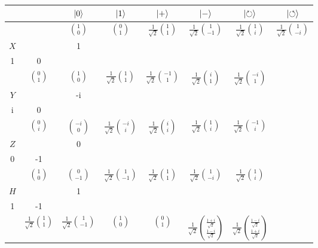 \begin{table}
\begin{tabular}{|c|c||c|c|c|c|c|c|}
\hline
 & & \(\Ket{0}\) & \(\Ket{1}\) & \(\Ket{+}\) & \(\Ket{-}\) & \(\Ket{\circlearrowright}\) & \(\Ket{\circlearrowleft}\) \\
\hline
 & & \(\binom{1}{0}\) & \(\binom{0}{1}\) & \(\frac{1}{\sqrt{2}} \binom{1}{1}\) & \(\frac{1}{\sqrt{2}} \binom{1}{-1}\) & \(\frac{1}{\sqrt{2}}\binom{1}{i}\) & \(\frac{1}{\sqrt{2}} \binom{1}{-i}\) \\
\hline

\(X\) &  \(\begin{pmatrix}
0 & 1\\
1 & 0\\
\end{pmatrix} \) & \(\binom{0}{1}\) & \(\binom{1}{0}\) & \(\frac{1}{\sqrt{2}} \binom{1}{1}\) & \(\frac{1}{\sqrt{2}} \binom{-1}{1}\) & \(\frac{1}{\sqrt{2}} \binom{i}{1}\) & \(\frac{1}{\sqrt{2}} \binom{-i}{1}\) \\
\hline

\(Y\)  &  \(\begin{pmatrix}
0 & -i\\
i & 0\\
\end{pmatrix} \) & \(\binom{0}{i}\) & \(\binom{-i}{0}\) & \(\frac{1}{\sqrt{2}} \binom{-i}{i}\) & \(\frac{1}{\sqrt{2}} \binom{i}{i}\) & \(\frac{1}{\sqrt{2}} \binom{1}{i}\) & \(\frac{1}{\sqrt{2}} \binom{-1}{i}\) \\
\hline

\(Z\)  &  \(\begin{pmatrix}
1 & 0\\
0 & -1\\
\end{pmatrix} \) & \(\binom{1}{0}\) & \(\binom{0}{-1}\) & \(\frac{1}{\sqrt{2}} \binom{1}{-1}\) & \(\frac{1}{\sqrt{2}} \binom{1}{1}\) & \(\frac{1}{\sqrt{2}} \binom{1}{-i}\) & \(\frac{1}{\sqrt{2}} \binom{1}{i}\) \\
\hline

\(H\)  &  \(\frac{1}{\sqrt{2}}\begin{pmatrix}
1 & 1\\
1 & -1\\
\end{pmatrix} \) & \(\frac{1}{\sqrt{2}}\binom{1}{1}\) & \(\frac{1}{\sqrt{2}}\binom{1}{-1}\) & \(\binom{1}{0}\) & \(\binom{0}{1}\) & \(\frac{1}{\sqrt{2}} \binom{\frac{1+i}{\sqrt{2}}}{\frac{1-i}{\sqrt{2}}}\) & \(\frac{1}{\sqrt{2}} \binom{\frac{1-i}{\sqrt{2}}}{\frac{1+i}{\sqrt{2}}}\) \\
\hline


\end{tabular}
\end{table}
